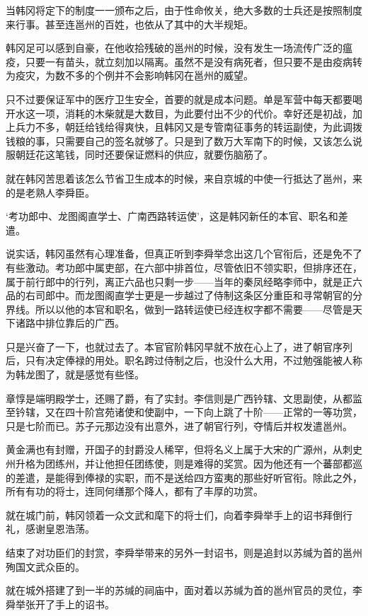 当韩冈将定下的制度一一颁布之后，由于性命攸关，绝大多数的士兵还是按照制度来行事。甚至连邕州的百姓，也依从了其中的大半规矩。

韩冈足可以感到自豪，在他收拾残破的邕州的时候，没有发生一场流传广泛的瘟疫，只要一有苗头，就立刻加以隔离。虽然不是没有病死者，但只要不是由疫病转为疫灾，为数不多的个例并不会影响韩冈在邕州的威望。

只不过要保证军中的医疗卫生安全，首要的就是成本问题。单是军营中每天都要喝开水这一项，消耗的木柴就是大数目，为此要付出不少的代价。幸好还是初战，加上兵力不多，朝廷给钱给得爽快，且韩冈又是专管南征事务的转运副使，为此调拨钱粮的事，只需要自己的签名就够了。只是到了数万大军南下的时候，又该怎么说服朝廷花这笔钱，同时还要保证燃料的供应，就要伤脑筋了。

就在韩冈苦思着该怎么节省卫生成本的时候，来自京城的中使一行抵达了邕州，来的是老熟人李舜臣。

‘考功郎中、龙图阁直学士、广南西路转运使’，这是韩冈新任的本官、职名和差遣。

说实话，韩冈虽然有心理准备，但真正听到李舜举念出这几个官衔后，还是免不了有些激动。考功郎中属吏部，在六部中排首位，尽管依旧不领实职，但排序还在，属于前行郎中的行列，离正六品也只剩一步——当年的秦凤经略李师中，就是正六品的右司郎中。而龙图阁直学士更是一步越过了侍制这条区分重臣和寻常朝官的分界线。所以以他的本官和职名，做到一路转运使已经连权字都不需要——尽管是天下诸路中排位靠后的广西。

只是兴奋了一下，也就过去了。本官官阶韩冈早就不放在心上了，进了朝官序列后，只有决定俸禄的用处。职名跨过侍制之后，也没什么大用，不过勉强能被人称为韩龙图了，就是感觉有些怪。

章惇是端明殿学士，还赐了爵，有了实封。李信则是广西钤辖、文思副使，从都监至钤辖，又在四十阶宫苑诸使和使副中，一下向上跳了十阶——正常的一等功赏，只是七阶而已。苏子元那边没有出意外，进了朝官行列，夺情后并权发遣邕州。

黄金满也有封赠，开国子的封爵没人稀罕，但将名义上属于大宋的广源州，从刺史州升格为团练州，并让他担任团练使，则是难得的奖赏。因为他还有一个蕃部都巡的差遣，是能得到俸禄的实职，而不是送给四方蛮夷的那些好听官衔。除此之外，所有有功的将士，连同何缮那个降人，都有了丰厚的功赏。

就在城门前，韩冈领着一众文武和麾下的将士们，向着李舜举手上的诏书拜倒行礼，感谢皇恩浩荡。

结束了对功臣们的封赏，李舜举带来的另外一封诏书，则是追封以苏缄为首的邕州殉国文武众臣的。

就在城外搭建了到一半的苏缄的祠庙中，面对着以苏缄为首的邕州官员的灵位，李舜举张开了手上的诏书。

